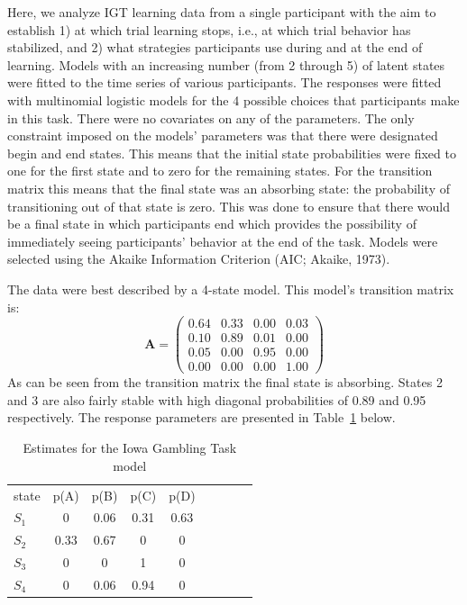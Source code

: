 \documentclass[a4paper,12pt,man,english]{apa} %
\newcommand{\citet}{\citeA}
\newcommand{\mat}{\mathbf}
\begin{document}
Here, we analyze IGT learning data from a single participant with the aim to
establish 1) at which trial learning stops, i.e., at which
trial behavior has stabilized, and 2) what strategies participants use
during and at the end of learning.  Models with an increasing number
(from 2 through 5) of latent states were fitted to the time series of
various participants.  The responses were fitted with multinomial
logistic models for the 4 possible choices that participants make in
this task.  There were no covariates on any of the parameters.  The
only constraint imposed on the models' parameters was that
there were designated begin and end states.  This means that the
initial state probabilities were fixed to one for the first state and
to zero for the remaining states.  For the transition matrix this means
that the final state was an absorbing state: the probability of
transitioning out of that state is zero.  This was done to ensure that
there would be a final state in which participants end which provides
the possibility of immediately seeing participants' behavior at the
end of the task.  Models were selected using the Akaike Information
Criterion (AIC; Akaike, 1973).

\nocite{Akaike1973} %

The data were best 
described by a 4-state model.  This model's transition matrix is:
$$
\mat{A} = \begin{pmatrix} 
				0.64 & 0.33 & 0.00 & 0.03 \\
				0.10 & 0.89 & 0.01 & 0.00 \\
				0.05 & 0.00 & 0.95 & 0.00 \\
				0.00 & 0.00 & 0.00 & 1.00
		  \end{pmatrix}
$$
As can be seen from the transition matrix the final state is
absorbing.  States 2 and 3 are also fairly stable with high diagonal
probabilities of 0.89 and 0.95 respectively.  The response parameters
are presented in Table~\ref{tab:igt4} below.

\begin{table}
	\caption{Estimates for the Iowa Gambling Task model}
	\label{tab:igt4}
	\begin{tabular}{lcccccccc} \hline
		state & p(A) & p(B) & p(C) & p(D) \\
		$S_1$ & 0    & 0.06 & 0.31 & 0.63 \\
		$S_2$ & 0.33 & 0.67 & 0    & 0 \\ 
		$S_3$ & 0    & 0    & 1    & 0 \\
		$S_4$ & 0    & 0.06 & 0.94 & 0 
	\end{tabular}
\end{table}
\end{document}
